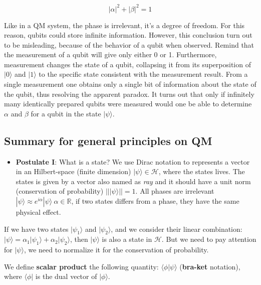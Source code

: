 \begin{equation*}
    |\alpha|^2+|\beta|^2=1
\end{equation*}

Like in a QM system, the phase is irrelevant, it's a degree of freedom. For this reason, qubits could store infinite information. However, this conclusion turn out to be misleading, because of the behavior of a qubit when observed. Remind that the measurement of a qubit will give only either 0 or 1. Furthermore, measurement changes the state of a qubit, collapsing it from its superposition of $|0\rangle$ and $|1\rangle$ to the specific state consistent with the measurement result. From a single measurement one obtains only a single bit of information about the state of the qubit, thus resolving the apparent paradox. It turns out that only if infinitely many identically prepared qubits were measured would one be able to determine $\alpha$ and $\beta$ for a qubit in the state $|\psi\rangle$.

\subsection{Summary for general principles on QM}
\begin{itemize}
    \item \textbf{Postulate I}: What is a state? We use Dirac notation to represents a vector in an Hilbert-space (finite dimension) $|\psi\rangle \in \mathcal{H}$, where the states lives. The states is given by a vector also named as \textit{ray} and it should have a unit norm (conservation of probability) $|| |\psi\rangle ||=1$. All phases are irrelevant $|\psi\rangle \approx e^{i\alpha}|\psi\rangle \ \alpha\in\mathbb{R}$, if two states differs from a phase, they have the same physical effect.
\end{itemize}
If we have two states $|\psi_1\rangle$ and $|\psi_2\rangle$, and we consider their linear combination: $|\psi\rangle = \alpha_1|\psi_1\rangle+\alpha_2|\psi_2\rangle$, then $|\psi\rangle$ is also a state in $\mathcal{H}$. But we need to pay attention for $|\psi\rangle$, we need to normalize it for the conservation of probability.

\begin{definition}
    We define \textbf{scalar product} the following quantity: $\langle\phi|\psi\rangle$ (\textbf{bra-ket} notation), where $\langle\phi|$ is the dual vector of $|\phi\rangle$.
\end{definition}

